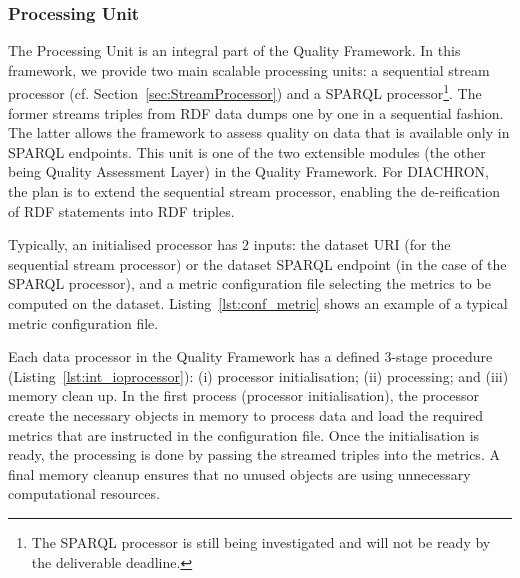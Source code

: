 \subsubsection{Processing Unit}
\label{sec:processingUnit}
The Processing Unit is an integral part of the Quality Framework.
In this framework, we provide two main scalable processing units: a sequential stream processor (cf. Section~\ref{sec:StreamProcessor}) and a SPARQL processor\footnote{The SPARQL processor is still being investigated and will not be ready by the deliverable deadline.}.
The former streams triples from RDF data dumps one by one in a sequential fashion.
The latter allows the framework to assess quality on data that is available only in SPARQL endpoints. 
This unit is one of the two extensible modules (the other being Quality Assessment Layer) in the Quality Framework.
For DIACHRON, the plan is to extend the sequential stream processor, enabling the de-reification of RDF statements into RDF triples.

Typically, an initialised processor has 2 inputs: the dataset URI (for the sequential stream processor) or the dataset SPARQL endpoint (in the case of the SPARQL processor), and a metric configuration file selecting the metrics to be computed on the dataset.
Listing~\ref{lst:conf_metric} shows an example of a typical metric configuration file.
 
Each data processor in the Quality Framework has a defined 3-stage procedure (Listing~\ref{lst:int_ioprocessor}): (i) processor initialisation; (ii) processing; and (iii) memory clean up.
In the first process (processor initialisation), the processor create the necessary objects in memory to process data and load the required metrics that are instructed in the configuration file.
Once the initialisation is ready, the processing is done by passing the streamed triples into the metrics.
A final memory cleanup ensures that no unused objects are using unnecessary computational resources.
 

